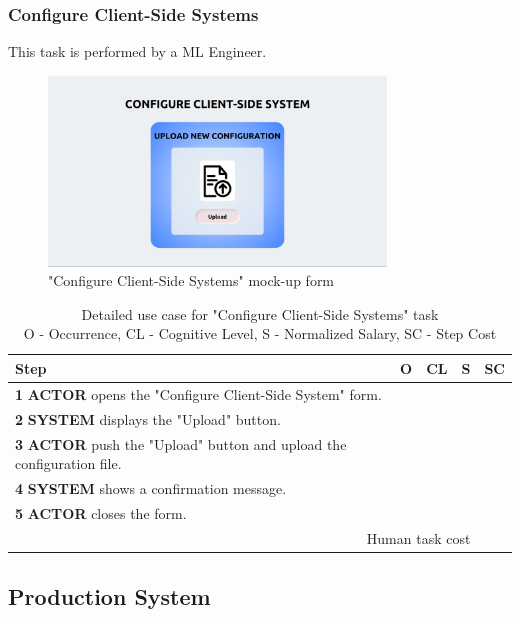 \subsubsection{Configure Client-Side Systems}
This task is performed by a ML Engineer.

\begin{figure}[H]
\centering
\includegraphics[width=0.8\textwidth]{figures/ui_configure_client-side.png}
\caption{"Configure Client-Side Systems" mock-up form}
\end{figure}

\begin{table}[H]
\centering
\begin{tabularx}{\textwidth}{|X|c|c|c|c|}
\hline
\textbf{Step} & \textbf{O} & \textbf{CL} & \textbf{S} & \textbf{SC} \\
\hline
\textbf{1} \textbf{ACTOR} opens the "Configure Client-Side System" form. &  & & & \\
\hline
\textbf{2} \textbf{SYSTEM} displays the "Upload" button.& & & & \\
\hline
\textbf{3} \textbf{ACTOR} push the "Upload" button and upload the configuration file. & & & &\\
\hline
\textbf{4} \textbf{SYSTEM} shows a confirmation message. & & & & \\
\hline
\textbf{5} \textbf{ACTOR} closes the form. & & & & \\
\hline
\multicolumn{4}{|r|}{Human task cost} & \\
\hline
\end{tabularx}
\caption{Detailed use case for "Configure Client-Side Systems" task\\ 
O - Occurrence, CL - Cognitive Level, S - Normalized Salary, SC - Step Cost}
\label{table:configure_client_side}
\end{table}


\subsection{Production System}

